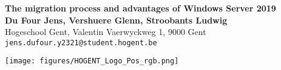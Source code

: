 \documentclass[a0,portrait]{a0poster}
\begin{document}


\begin{minipage}[t]{0.75\linewidth}
\VeryHuge \color{HoGentAccent1} \textbf{The migration process and advantages of Windows Server 2019} \color{Black}\\ %
\huge \textbf{Du Four Jens, Vershuere Glenn, Stroobants Ludwig}\\[0.5cm] %
\huge Hogeschool Gent, Valentin Vaerwyckweg 1, 9000 Gent\\[0.4cm] %
\Large \texttt{jens.dufour.y2321@student.hogent.be} \\
\end{minipage}
%
\begin{minipage}[t]{0.25\linewidth}
\texttt{[image: figures/HOGENT\_Logo\_Pos\_rgb.png]} 

\end{minipage}

\vspace{1cm} %

\end{document}
